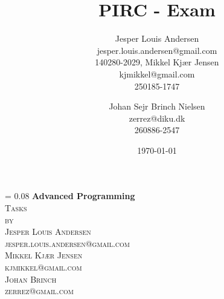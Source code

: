 \documentclass[a4paper, oneside, 10pt, draft]{memoir}
\author{Jesper Louis
  Andersen\\jesper.louis.andersen@gmail.com\\140280-2029,
  Mikkel Kj\ae r Jensen \\ kjmikkel@gmail.com\\250185-1747 \and
  Johan Sejr Brinch Nielsen \\ zerrez@diku.dk \\ 260886-2547
}
\title{PIRC - Exam}
\date{\today}
\makeatletter
\renewcommand*{\titleM}{\begingroup%
  \drop = 0.08\textheight
  \centering
  {\Huge\bfseries Advanced Programming}\\[\baselineskip]
  {\scshape Tasks}\\[\baselineskip]
  {\scshape by}\\[\baselineskip]
  {\large\scshape Jesper Louis Andersen\\jesper.louis.andersen@gmail.com}\\[\baselineskip]
  {\large\scshape Mikkel Kj\ae r Jensen\\kjmikkel@gmail.com}\\[\baselineskip]
  {\large\scshape Johan Brinch\\zerrez@gmail.com}\\[\baselineskip]
  \endgroup}
\newcommand{\hide}[1]{}
\makeatother
\begin{document}
\titleM






%



\appendix
\hide{
\clearpage
\section{Source}

\clearpage

\clearpage

\clearpage

\clearpage

}
\end{document}
